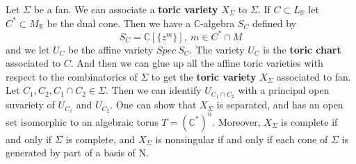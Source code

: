 \documentclass[11pt]{article}
\begin{document}
Let $\Sigma$ be a fan. We can associate a \textbf{toric variety} $X_\Sigma$ to $\Sigma$. If $C\subset L_\mathbb{R}$ let $C^*\subset M_\mathbb{R}$ be the dual cone. Then we have a $\mathbb{C}$-algebra $S_C$ defined by
\begin{equation*}
S_C=\mathbb{C}[\{z^{m}\}],\  m\in C^*\cap M
\end{equation*}
and we let $U_C$ be the affine variety $Spec\ S_C$. The variety $U_C$ is the \textbf{toric chart} associated to $C$.
And then we can glue up all the affine toric varieties with respect to the combinatorics of $\Sigma$ to get the \textbf{toric variety} $X_\Sigma$ associated to fan. Let $C_1, C_2, C_1\cap C_2\in \Sigma$. Then we can identify $U_{C_1\cap C_2}$ with a principal open suvariety of $U_{C_1}$ and $U_{C_2}$. One can show that $X_\Sigma$ is separated, and has an open set isomorphic to an algebraic torus $T=(\mathbb{C}^*)^n$. Moreover, $X_\Sigma$ is complete if and only if $\Sigma$ is complete, and $X_\Sigma$ is nonsingular if and only if each cone of $\Sigma$ is generated by part of a basis of N.
\end{document}
